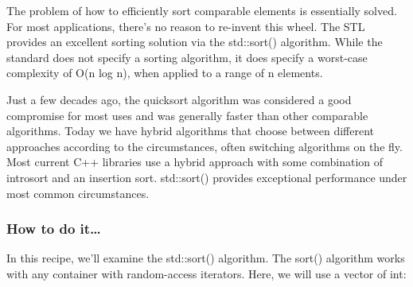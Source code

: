 
The problem of how to efficiently sort comparable elements is essentially solved. For most applications, there's no reason to re-invent this wheel. The STL provides an excellent sorting solution via the std::sort() algorithm. While the standard does not specify a sorting algorithm, it does specify a worst-case complexity of O(n log n), when applied to a range of n elements.

Just a few decades ago, the quicksort algorithm was considered a good compromise for most uses and was generally faster than other comparable algorithms. Today we have hybrid algorithms that choose between different approaches according to the circumstances, often switching algorithms on the fly. Most current C++ libraries use a hybrid approach with some combination of introsort and an insertion sort. std::sort() provides exceptional performance under most common circumstances.

\subsubsection{How to do it…}

In this recipe, we'll examine the std::sort() algorithm. The sort() algorithm works with any container with random-access iterators. Here, we will use a vector of int:

